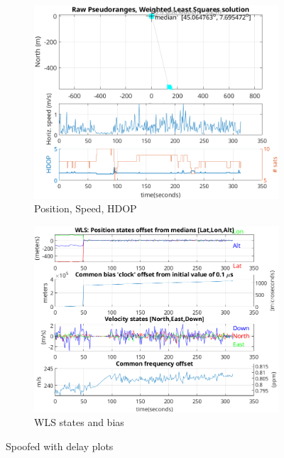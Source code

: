 \begin{figure}[h!]
            \hfill
            \begin{subfigure}{0.23\textwidth}
                \vspace{0.40cm}
                \includegraphics[width=\textwidth]{images/tests/Monte_Cappuccini/Spoofing/task6_figures/Samsung_A51_Monte_Cappuccini_fig4.png}
                \caption{Position, Speed, HDOP}
                \label{fig:Delay_c}
            \end{subfigure}
            \hfill
            \begin{subfigure}{0.23\textwidth}
                \vspace{0.40cm}
                \includegraphics[width=\textwidth]{images/tests/Monte_Cappuccini/Spoofing/task6_figures/Samsung_A51_Monte_Cappuccini_fig5.png}
                \caption{WLS states and bias}
                \label{fig:Delay_d}
            \end{subfigure}
            \vspace{0.35cm}
            \caption{Spoofed with delay plots}
            \label{fig:delay_plots}
        \end{figure}


